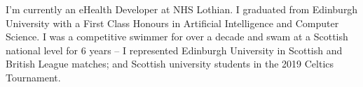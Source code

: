 

\begin{cvparagraph}
    I'm currently an eHealth Developer at NHS Lothian. I graduated from Edinburgh University with a First Class Honours in Artificial Intelligence and Computer Science. I was a competitive swimmer for over a decade and swam at a Scottish national level for 6 years -- I represented Edinburgh University in Scottish and British League matches; and Scottish university students in the 2019 Celtics Tournament.
\end{cvparagraph}


